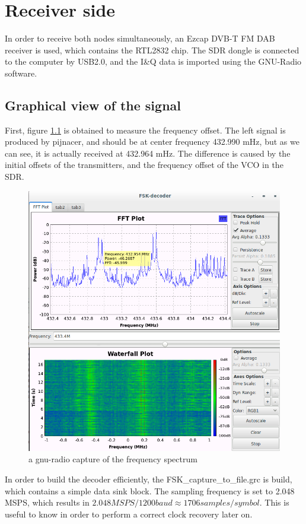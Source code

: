 \chapter{Receiver side}

In order to receive both nodes simultaneously, an Ezcap DVB-T FM DAB receiver is used, which contains the RTL2832 chip. The SDR dongle is connected to the computer by USB2.0, and the I\&Q data is imported using the GNU-Radio software. 

\section{Graphical view of the signal}
First, figure \ref{fig:gnuradio_waterfall} is obtained to measure the frequency offset. 
The left signal is produced by pijnacer, and should be at center frequency 432.990 mHz, but as we can see, it is actually received at 432.964 mHz. The difference is caused by the initial offsets of the transmitters, and the frequency offset of the VCO in the SDR. 

\begin{figure}[h]
\centering
\includegraphics[width=0.7\linewidth]{figures/gnuradio_waterfall_catpure}
\caption{a gnu-radio capture of the frequency spectrum}
\label{fig:gnuradio_waterfall}
\end{figure}

In order to build the decoder efficiently, the FSK\_capture\_to\_file.grc is build, which contains a simple data sink block. The sampling frequency is set to 2.048 MSPS, which results in $2.048MSPS / 1200 baud \approx 1706 samples/symbol$. This is useful to know in order to perform a correct clock recovery later on.

